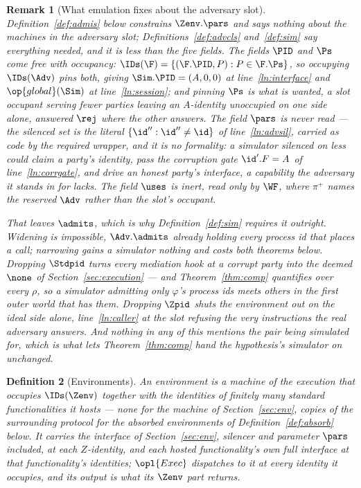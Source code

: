 \documentclass[10pt,oneside,openany]{book}
\theoremstyle{accentdef}
\newtheorem{definition}{Definition}[chapter]
\newtheorem{remark}[definition]{Remark}
\theoremstyle{accentplain}
\begin{document}
\begin{remark}[What emulation fixes about the adversary slot]\label{rem:advpars}
Definition~\ref{def:admis} below constrains $\Zenv.\pars$ and says nothing about the machines in
the adversary slot; Definitions~\ref{def:advcls} and~\ref{def:sim} say everything needed, and it
is less than the five fields. The fields $\PID$ and $\Ps$ come free with occupancy:
$\IDs(\F) = \{(\F.\PID,P) : P \in \F.\Ps\}$, so occupying $\IDs(\Adv)$ pins both, giving
$\Sim.\PID = (A,0,0)$ at line~\ref{ln:interface} and $\op{global}(\Sim)$ at
line~\ref{ln:session}; and pinning $\Ps$ is what is wanted, a slot occupant serving fewer parties
leaving an $A$-identity unoccupied on one side alone, answered $\rej$ where the other answers.
The field $\pars$ is never read --- the silenced set is the literal
$\{\id'' : \id'' \neq \id\}$ of line~\ref{ln:advsil}, carried as code by the required wrapper,
and it is no formality: a simulator silenced on \emph{less} could claim a party's identity, pass
the corruption gate $\id'.F = A$ of line~\ref{ln:corrgate}, and drive an honest party's
interface, a capability the adversary it stands in for lacks. The field $\uses$ is inert, read only by
$\WF$, where $\pi^{+}$ names the reserved $\Adv$ rather than the slot's occupant.

That leaves $\admits$, which is why Definition~\ref{def:sim} requires it outright. Widening is
impossible, $\Adv.\admits$ already holding every process id that places a call; narrowing gains a
simulator nothing and costs both theorems below. Dropping $\Stdpid$ turns every mediation hook at a
corrupt party into the deemed $\none$ of Section~\ref{sec:execution} --- and
Theorem~\ref{thm:comp} quantifies over every $\rho$, so a simulator admitting only $\varphi$'s
process ids meets others in the first outer world that has them. Dropping $\Zpid$ shuts the
environment out on the ideal side alone, line~\ref{ln:caller} at the slot refusing the very
instructions the real adversary answers. And nothing in any of this mentions the pair being
simulated for, which is what lets Theorem~\ref{thm:comp} hand the hypothesis's simulator on
unchanged.
\end{remark}

\begin{definition}[Environments]\label{def:env}
An \emph{environment} is a machine of the execution that occupies $\IDs(\Zenv)$ together with the
identities of finitely many standard functionalities it \emph{hosts} --- none for the machine of
Section~\ref{sec:env}, copies of the surrounding protocol for the absorbed environments of
Definition~\ref{def:absorb} below. It carries the interface of Section~\ref{sec:env}, silencer
and parameter $\pars$ included, at each $Z$-identity, and each hosted functionality's own full
interface at that functionality's identities; $\opl{Exec}$ dispatches to it at every identity it
occupies, and its output is what its $\Zenv$ part returns.
\end{definition}
\end{document}
